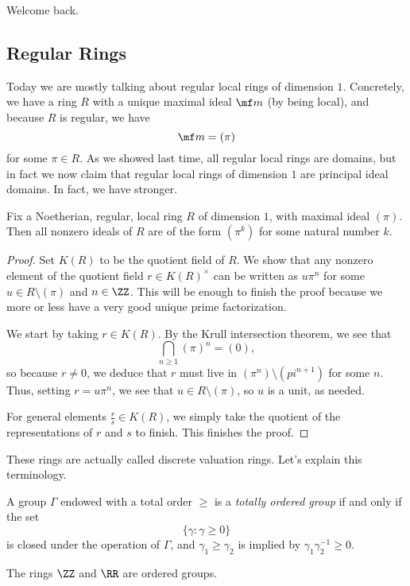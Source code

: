 
Welcome back.

\subsection{Regular Rings}
Today we are mostly talking about regular local rings of dimension $1$. Concretely, we have a ring $R$ with a unique maximal ideal $\mf m$ (by being local), and because $R$ is regular, we have
\[\mf m=(\pi)\]
for some $\pi\in R$. As we showed last time, all regular local rings are domains, but in fact we now claim that regular local rings of dimension $1$ are principal ideal domains. In fact, we have stronger.
\begin{proposition} \label{prop:altdvr}
	Fix a Noetherian, regular, local ring $R$ of dimension $1$, with maximal ideal $(\pi)$. Then all nonzero ideals of $R$ are of the form $\left(\pi^k\right)$ for some natural number $k$.
\end{proposition}
\begin{proof}
	Set $K(R)$ to be the quotient field of $R$. We show that any nonzero element of the quotient field $r\in K(R)^\times$ can be written as $u\pi^n$ for some $u\in R\setminus(\pi)$ and $n\in\ZZ$. This will be enough to finish the proof because we more or less have a very good unique prime factorization.

	We start by taking $r\in K(R)$. By the Krull intersection theorem, we see that
	\[\bigcap_{n\ge1}(\pi)^n=(0),\]
	so because $r\ne0$, we deduce that $r$ must live in $\left(\pi^n\right)\setminus\left(pi^{n+1}\right)$ for some $n$. Thus, setting $r=u\pi^n$, we see that $u\in R\setminus(\pi)$, so $u$ is a unit, as needed.

	For general elements $\frac rs\in K(R)$, we simply take the quotient of the representations of $r$ and $s$ to finish. This finishes the proof.
\end{proof}
These rings are actually called discrete valuation rings. Let's explain this terminology.
\begin{definition}
	A group $\Gamma$ endowed with a total order $\ge$ is a \textit{totally ordered group} if and only if the set
	\[\{\gamma:\gamma\ge0\}\]
	is closed under the operation of $\Gamma$, and $\gamma_1\ge\gamma_2$ is implied by $\gamma_1\gamma_2^{-1}\ge0$.
\end{definition}
\begin{example}
	The rings $\ZZ$ and $\RR$ are ordered groups.
\end{example}
